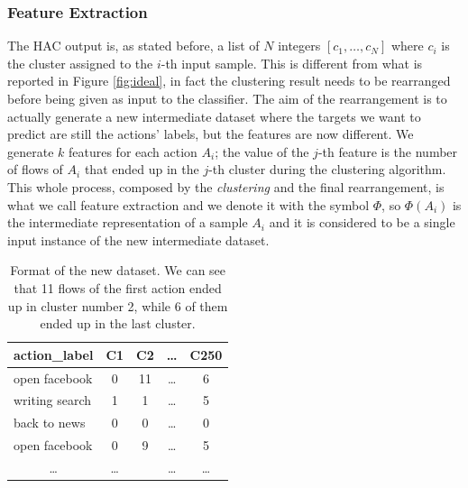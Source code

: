 \subsubsection{Feature Extraction}
\label{subsubsec:fexc}
The HAC output is, as stated before, a list of $N$ integers $[c_1,\dots, c_N]$ where $c_i$ is the cluster assigned to the $i$-th input sample. This is different from what is reported in Figure \ref{fig:ideal}, in fact the clustering result needs to be rearranged before being given as input to the classifier. The aim of the rearrangement is to actually generate a new intermediate dataset where the targets we want to predict are still the actions' labels, but the features are now different. We generate $k$ features for each action $A_i$; the value of the $j$-th feature is the number of flows of $A_i$ that ended up in the $j$-th cluster during the clustering algorithm. This whole process, composed by the \textit{clustering} and the final rearrangement, is what we call feature extraction and we denote it with the symbol $\Phi$, so $\Phi(A_i)$ is the intermediate representation of a sample $A_i$ and it is considered to be a single input instance of the new intermediate dataset.

\begin{table}[]
\label{tab:newdataset}
\centering
\begin{tabular}{@{}lcccc@{}}
\toprule
\textbf{action\_label}     & \multicolumn{1}{l}{\textbf{C1}} & \multicolumn{1}{l}{\textbf{C2}} & \multicolumn{1}{l}{\textbf{\dots}} & \multicolumn{1}{l}{\textbf{C250}} \\ \midrule
open facebook              & 0                               & 11                              & \dots                              & 6                                \\
writing search             & 1                               & 1                               & \dots                              & 5                                \\
back to news               & 0                               & 0                               & \dots                              & 0                                \\
open facebook              & 0                               & 9                               & \dots                              & 5                                \\
\multicolumn{1}{c}{\dots} & \dots                          &                                 & \dots                             & \dots                           \\ \bottomrule
\end{tabular}
\caption{\small{Format of the new dataset. We can see that 11 flows of the first action ended up in cluster number 2, while 6 of them ended up in the last cluster.}}
\end{table}

